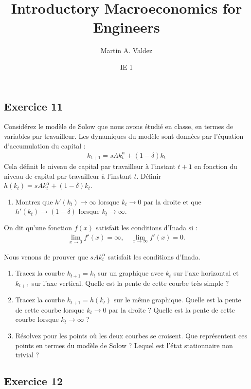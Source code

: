 \documentclass[11pt]{article}
\title{Introductory Macroeconomics for Engineers}
\author{Martin A. Valdez}
\date{IE 1}
\begin{document}
\maketitle
\subsection*{Exercice 11}
Considérez le modèle de Solow que nous avons étudié en classe, en termes de 
variables par travailleur.
Les dynamiques du modèle sont données par l'équation d'accumulation du capital :
\begin{align*}
    k_{t+1} = sA k^{\alpha}_t + (1 - \delta) k_t
\end{align*}
Cela définit le niveau de capital par travailleur à l'instant \( t+1 \) en fonction du
niveau de capital par travailleur à l'instant \( t \).
Définir \(h(k_t) = sAk_t^{\alpha} + (1 - \delta)k_t\).

\begin{enumerate}
    \item Montrez que \(h'(k_t) \to \infty\) lorsque \(k_t \to 0\) par la droite et que \(h'(k_t) \to (1-\delta)\) lorsque \(k_t \to \infty\).
\end{enumerate}

On dit qu'une fonction \(f(x)\) satisfait les conditions d'Inada si :
\begin{align*}
    \lim_{x \to 0} f'(x) = \infty, \quad \lim_{x \to \infty} f'(x) = 0.
\end{align*}

Nous venons de prouver que \(sAk_t^{\alpha} \) satisfait les conditions d'Inada.

\begin{enumerate}[resume]
    \item Tracez la courbe \(k_{t+1} = k_t\) sur un graphique avec \(k_t\) sur l'axe horizontal et \(k_{t+1}\) sur
    l'axe vertical. Quelle est la pente de cette courbe très simple ?
    \item Tracez la courbe \(k_{t+1} = h(k_t)\) sur le même graphique. Quelle est la pente de cette courbe 
    lorsque \(k_t \to 0\) par la droite ? Quelle est la pente de cette courbe lorsque \(k_t \to \infty\) ?
    \item Résolvez pour les points où les deux courbes se croisent. 
    Que représentent ces points en termes du modèle de Solow ? Lequel est l'état stationnaire non trivial ?
\end{enumerate}

\subsection*{Exercice 12}
\end{document}
